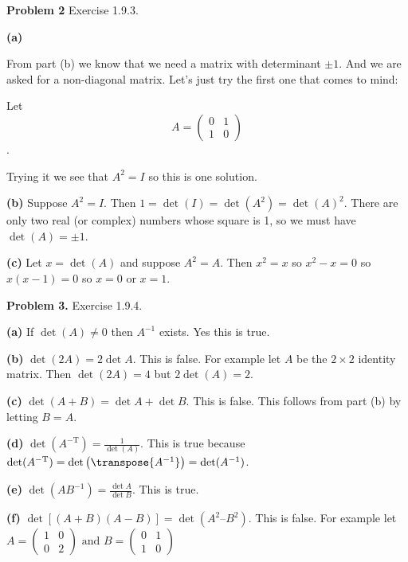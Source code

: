 \documentclass[oneside,12pt]{amsart}
\begin{document}
\bigskip

\textbf{Problem 2} Exercise 1.9.3.

\bigskip

\textbf{(a)}

From part (b) we know that we need a matrix with determinant $\pm 1$.
And we are asked for a non-diagonal matrix. Let's just try the first
one that comes to mind:

Let
$$
A=
\begin{pmatrix}
0 & 1 \\
1 & 0
\end{pmatrix}
$$.

Trying it we see that $A^2=I$ so this is one solution.

\bigskip

\textbf{(b)} Suppose $A^2=I$. Then $1=\det(I) = \det(A^2) = \det(A)^2$.
There are only two real (or complex) numbers whose square is 1, so we
must have $\det(A) = \pm 1$.

\bigskip

\textbf{(c)} Let $x=\det(A)$ and suppose $A^2=A$. Then $x^2=x$ so $x^2-x=0$ so $x(x-1)=0$ so $x=0$ or $x=1$.

\bigskip

\textbf{Problem 3.} Exercise 1.9.4.

\bigskip

\textbf{(a)} If $\det(A)\not=0$ then $A^{-1}$ exists. Yes this is true.

\bigskip

\textbf{(b)} $\det(2A) = 2 \det A$. This is false. For example let $A$ be
the $2\times 2$ identity matrix. Then $\det(2A)=4$ but $2\det(A)=2$.

\bigskip

\textbf{(c)} $\det(A + B) = \det A + \det B$. This is false. This
follows from part (b) by letting $B=A$.

\bigskip

\textbf{(d)} $\det(A^{-\text{T}}) = \frac{1}{\det(A)}$. This is true because
$\det(A^{-\text{T}}) = \det\left( \transpose{A^{-1}} \right) = \det(A^{-1})$.

\bigskip

\textbf{(e)} $\det(AB^{-1}) = \frac{\det A}{\det B}$. This is true.

\bigskip

\textbf{(f)} $\det[(A + B)(A-B)] = \det( A^2 – B^2)$. This is false.
For example let
$A=
\begin{pmatrix}
1 & 0 \\
0 & 2
\end{pmatrix}
\text{ and }
B=
\begin{pmatrix}
0 & 1 \\
1 & 0
\end{pmatrix}
$
\end{document}
